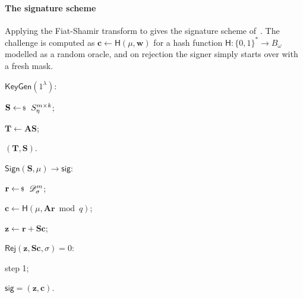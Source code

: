 \documentclass[../../book.tex]{subfiles}
\begin{document}
\paragraph{The signature scheme}
Applying the Fiat-Shamir transform to  gives the signature scheme of~\cite{EC:Lyubashevsky12}.
The challenge is computed as $\mathbf{c} \gets \mathsf{H}(\mu, \mathbf{w})$ for a hash function $\mathsf{H}: \{0,1\}^* \to B_{\omega}$ modelled as a random oracle, and on rejection the signer simply starts over with a fresh mask.

\begin{algoproto}[ht]
    \small
    \centering
    \begin{mdframed}[linecolor=black, linewidth=1pt,
                     skipabove=10pt, skipbelow=10pt,
                     innerleftmargin=5pt, innerrightmargin=5pt]
        \begin{minipage}[t]{0.25\linewidth}
            \colorbox{oc-blue-1}{$\mathsf{KeyGen}(1^{\lambda})$:}
            \begin{algoen}
                \item $\mathbf{S} \leftarrowS S_{\eta}^{m \times k}$;
                \item $\mathbf{T} \gets \mathbf{A}\mathbf{S}$;
                \item {} $(\mathbf{T}, \mathbf{S})$.
            \end{algoen}
        \end{minipage}
        \hfill
        \begin{minipage}[t]{0.38\linewidth}
            \colorbox{oc-blue-1}{$\mathsf{Sign}(\mathbf{S}, \mu) \to \mathsf{sig}$:}
            \begin{algoen}
                \item $\mathbf{r} \leftarrowS \dgaussian^m_{\sigma}$;
                \item $\mathbf{c} \gets \mathsf{H}(\mu, \mathbf{A}\mathbf{r} \bmod q)$;
                \item $\mathbf{z} \gets \mathbf{r} + \mathbf{S}\mathbf{c}$; 
                \item {} $\mathsf{Rej}(\mathbf{z}, \mathbf{S}\mathbf{c}, \sigma) = 0$: 
                \item \hspace{5px}  step 1;
                \item {} $\mathsf{sig} = (\mathbf{z}, \mathbf{c})$.
            \end{algoen}

\end{minipage}
\end{mdframed}
\end{algoproto}
\end{document}
